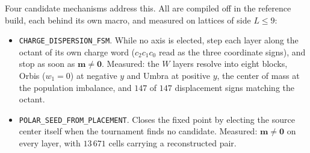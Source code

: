 \documentclass[a4paper]{article}
\begin{document}
Four candidate mechanisms address this.  All are compiled off in the reference build, each behind its own macro, and measured on lattices of side $L\le 9$:
\begin{itemize}
\item \texttt{CHARGE\_DISPERSION\_FSM}.  While no axis is elected, step each layer along the octant of its own charge word ($c_2c_1c_0$ read as the three coordinate signs), and stop as soon as $\boldsymbol m\neq\mathbf 0$.  Measured: the $W$ layers resolve into eight blocks, Orbis ($w_1=0$) at negative $y$ and Umbra at positive $y$, the center of mass at the population imbalance, and $147$ of $147$ displacement signs matching the octant.
\item \texttt{POLAR\_SEED\_FROM\_PLACEMENT}.  Closes the fixed point by electing the source center itself when the tournament finds no candidate.  Measured: $\boldsymbol m\neq\mathbf 0$ on every layer, with $13\,671$ cells carrying a reconstructed pair.

\end{itemize}
\end{document}
